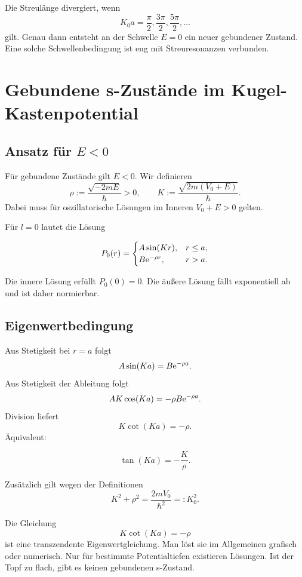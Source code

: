 \begin{conceptbox}
Die Streulänge divergiert, wenn
\[
    K_0a=\frac{\pi}{2},\frac{3\pi}{2},\frac{5\pi}{2},\dots
\]
gilt. Genau dann entsteht an der Schwelle \(E=0\) ein neuer gebundener Zustand. Eine solche Schwellenbedingung ist eng mit Streuresonanzen verbunden.
\end{conceptbox}

\section{Gebundene s-Zustände im Kugel-Kastenpotential}

\subsection{Ansatz für \texorpdfstring{\(E<0\)}{E<0}}

Für gebundene Zustände gilt \(E<0\). Wir definieren
\[
    \rho:=\frac{\sqrt{-2mE}}{\hbar}>0,
    \qquad
    K:=\frac{\sqrt{2m(V_0+E)}}{\hbar}.
\]
Dabei muss für oszillatorische Lösungen im Inneren \(V_0+E>0\) gelten.

Für \(l=0\) lautet die Lösung
\begin{formulabox}
\[
    P_0(r)=
    \begin{cases}
        A\sin(Kr), & r\le a,\\
        B\mathrm{e}^{-\rho r}, & r>a.
    \end{cases}
\]
\end{formulabox}
Die innere Lösung erfüllt \(P_0(0)=0\). Die äußere Lösung fällt exponentiell ab und ist daher normierbar.

\subsection{Eigenwertbedingung}

Aus Stetigkeit bei \(r=a\) folgt
\[
    A\sin(Ka)=B\mathrm{e}^{-\rho a}.
\]
Aus Stetigkeit der Ableitung folgt
\[
    AK\cos(Ka)=-\rho B\mathrm{e}^{-\rho a}.
\]
Division liefert
\[
    K\cot(Ka)=-\rho.
\]
Äquivalent:
\begin{formulabox}
\[
    \tan(Ka)=-\frac{K}{\rho}.
\]
\end{formulabox}
Zusätzlich gilt wegen der Definitionen
\[
    K^2+\rho^2=\frac{2mV_0}{\hbar^2}=:K_0^2.
\]

\begin{conceptbox}
Die Gleichung
\[
    K\cot(Ka)=-\rho
\]
ist eine transzendente Eigenwertgleichung. Man löst sie im Allgemeinen grafisch oder numerisch. Nur für bestimmte Potentialtiefen existieren Lösungen. Ist der Topf zu flach, gibt es keinen gebundenen s-Zustand.
\end{conceptbox}


